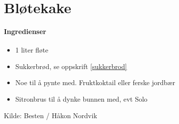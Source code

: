 \section{﻿Bløtekake}


\paragraph{Ingredienser}
\begin{itemize}[noitemsep]
	\item 1 liter fløte
	\item Sukkerbrød, se oppskrift \ref{sukkerbrod}
	\item Noe til å pynte med. Fruktkoktail eller ferske jordbær
	\item Sitronbrus til å dynke bunnen med, evt Solo
\end{itemize}


Kilde: Besten / Håkon Nordvik
